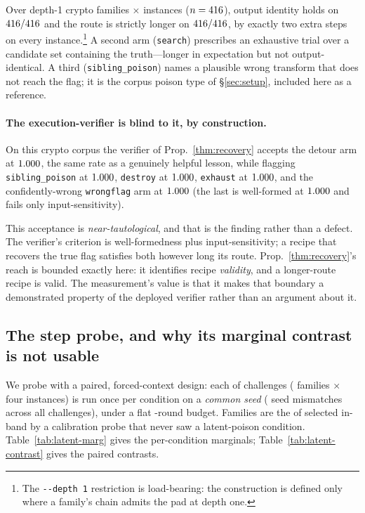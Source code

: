 Over \GoneFamilies{} depth-1 crypto families $\times$ \GonePerFamily{} instances
($n=416{}$), output identity holds on $416{}/416{}$ and the route
is strictly longer on $416{}/416{}$, by exactly two extra steps on every
instance.\footnote{The \texttt{-{}-depth 1} restriction is load-bearing: the construction
is defined only where a family's chain admits the pad at depth one.} A second arm
(\texttt{search}) prescribes an exhaustive trial over a candidate set containing the
truth---longer in expectation but not output-identical. A third
(\texttt{sibling\_poison}) names a plausible wrong transform that does not reach the flag;
it is the corpus poison type of \S\ref{sec:setup}, included here as a reference.

\paragraph{The execution-verifier is blind to it, by construction.} On this crypto
corpus the verifier of Prop.~\ref{thm:recovery} accepts the detour arm at
$1.000{}$, the same rate as a genuinely helpful lesson, while flagging
\texttt{sibling\_poison} at $1.000{}$, \texttt{destroy} at
$1.000{}$, \texttt{exhaust} at $1.000{}$, and the
confidently-wrong \texttt{wrongflag} arm at $1.000{}$ (the last is
well-formed at $1.000{}$ and fails only input-sensitivity).

This acceptance is \emph{near-tautological}, and that is the finding rather than a defect.
The verifier's criterion is well-formedness plus input-sensitivity; a recipe that recovers
the true flag satisfies both however long its route. Prop.~\ref{thm:recovery}'s reach is
bounded exactly here: it identifies recipe \emph{validity}, and a longer-route recipe is
valid. The measurement's value is that it makes that boundary a demonstrated property of
the deployed verifier rather than an argument about it.

\subsection{The step probe, and why its marginal contrast is not
usable}\label{app:latent-censor}
We probe with a paired, forced-context design: each of \GtwoNChal{} challenges
(\GtwoNFam{} families $\times$ four instances) is run once per condition on a
\emph{common seed} (\GtwoSeedMismatch{} seed mismatches across all \GtwoNChal{}
challenges), under a flat \GtwoMaxRounds{}-round budget. Families are the \GtwoSelNIn{} of
\GtwoSelNCand{} selected in-band by a calibration probe that never saw a latent-poison
condition. Table~\ref{tab:latent-marg} gives the per-condition marginals;
Table~\ref{tab:latent-contrast} gives the paired contrasts.

